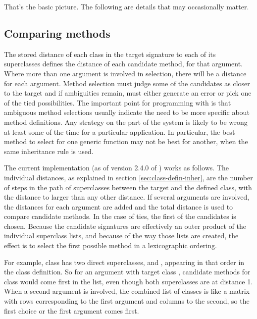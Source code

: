 \documentclass[11pt]{article}
\begin{document}
That's the basic picture.  The following are details that may occasionally matter.

\subsection*{Comparing methods}

The stored distance of each class in the target signature to each of its superclasses defines the distance of each candidate method, for that argument.
Where more than one argument is involved in selection, there will be a distance for each argument.
Method selection must judge some of the candidates as closer to the target and if ambiguities remain, must either generate an error or pick one of the tied possibilities.
The important point for programming with \R{} is that ambiguous method selections usually indicate the need to be more specific about method definitions.
Any strategy on the part of the system is likely to be wrong at least some of the time for a particular application.
In particular, the best method to select for one generic function may not be best for another, when the same inheritance rule is used.

The current implementation (as of version 2.4.0 of \R{}) works as follows.
The individual distances, as explained in section \ref{sec:class-defin-inher}, are the number of steps in the path of superclasses between the target and the defined class, with the distance to  larger than any other distance.
If several arguments are involved, the distances for each argument are added and the total distance is used to compare candidate methods.
In the case of ties, the first of the candidates is chosen.
Because the candidate signatures are effectively an outer product of the individual superclass lists, and because of the way those lists are created, the effect is to select the first possible method in a lexicographic ordering.

For example, class  has two direct superclasses,  and , appearing in that order in the class definition.
So for an argument with target class , candidate methods for class  would come first in the list, even though both superclasses are at distance 1.
When a second argument is involved, the combined list of classes is like a matrix with rows corresponding to the first argument and columns to the second, so the first choice or the first argument comes first.
\end{document}
